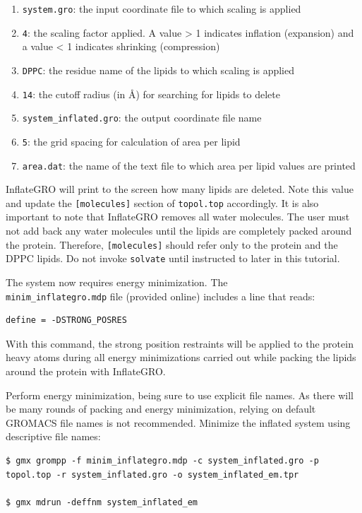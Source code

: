 \documentclass[9pt,tutorial,pubversion]{livecoms}
\begin{document}
\begin{enumerate}
	\item{\texttt{system.gro}: the input coordinate file to which scaling is applied}
	\item{\texttt{4}: the scaling factor applied. A value > 1 indicates inflation (expansion) and a value < 1 indicates shrinking (compression)}
	\item{\texttt{DPPC}: the residue name of the lipids to which scaling is applied}
	\item{\texttt{14}: the cutoff radius (in \AA) for searching for lipids to delete}
	\item{\texttt{system\_inflated.gro}: the output coordinate file name}
	\item{\texttt{5}: the grid spacing for calculation of area per lipid}
	\item{\texttt{area.dat}: the name of the text file to which area per lipid values are printed}
\end{enumerate}

InflateGRO will print to the screen how many lipids are deleted. Note this value and update the \texttt{[molecules]} section of \texttt{topol.top} accordingly. It is also important to note that InflateGRO removes all water molecules. The user must not add back any water molecules until the lipids are completely packed around the protein. Therefore, \texttt{[molecules]} should refer only to the protein and the DPPC lipids. Do not invoke \texttt{solvate} until instructed to later in this tutorial.

The system now requires energy minimization. The\\ \texttt{minim\_inflategro.mdp} file (provided online) includes a line that reads:

\begin{lstlisting}
define = -DSTRONG_POSRES
\end{lstlisting}
%
With this command, the strong position restraints will be applied to the protein heavy atoms during all energy minimizations carried out while packing the lipids around the protein with InflateGRO.

Perform energy minimization, being sure to use explicit file names. As there will be many rounds of packing and energy minimization, relying on default GROMACS file names is not recommended. Minimize the inflated system using descriptive file names:

\begin{lstlisting}
$ gmx grompp -f minim_inflategro.mdp -c system_inflated.gro -p topol.top -r system_inflated.gro -o system_inflated_em.tpr

$ gmx mdrun -deffnm system_inflated_em
\end{lstlisting}
\end{document}
